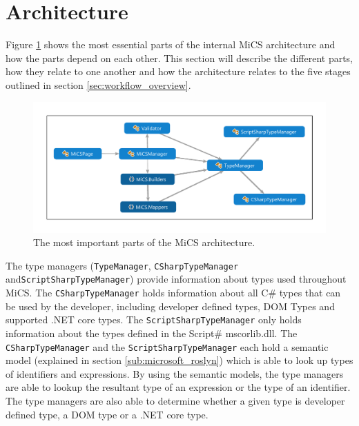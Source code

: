 \section{Architecture} %
\label{sec:architecture}
Figure \ref{fig:dependencygraph} shows the most essential parts of the internal MiCS architecture and how the parts depend on each other. 
This section will describe the different parts, how they relate to one another and how the architecture relates to the five stages outlined in section \ref{sec:workflow_overview}. 

\begin{figure}
	\begin{center}
		\centerline{\includegraphics[width=15cm]{resources/images/architecture.pdf}}
	\end{center}
	\caption{The most important parts of the MiCS architecture.}
	\label{fig:dependencygraph}
\end{figure}


The type managers (\texttt{TypeManager}, \texttt{CSharpTypeManager} and\newline \texttt{ScriptSharpTypeManager}) provide information about types used throughout MiCS. The \texttt{CSharpTypeManager} holds information about all C\# types that can be used by the developer, including developer defined types, DOM Types and supported .NET core types. The \texttt{ScriptSharpTypeManager} only holds information about the types defined in the Script\# mscorlib.dll. The \texttt{CSharpTypeManager} and the \texttt{ScriptSharpTypeManager} each hold a semantic model (explained in section \ref{sub:microsoft_roslyn}) which is able to look up types of identifiers and expressions. By using the semantic models, the type managers are able to lookup the resultant type of an expression or the type of an identifier. The type managers are also able to determine whether a given type is developer defined type, a DOM type or a .NET core type.

